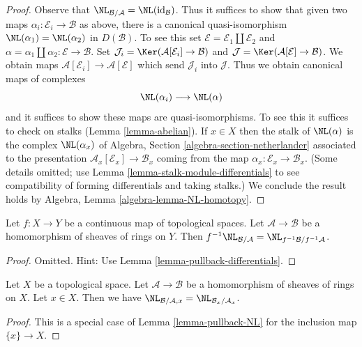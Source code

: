 \begin{proof}
Observe that $\NL_{\mathcal{B}/\mathcal{A}} = \NL(\text{id}_\mathcal{B})$.
Thus it suffices to show that given two maps
$\alpha_i : \mathcal{E}_i \to \mathcal{B}$ as above, there is a
canonical quasi-isomorphism $\NL(\alpha_1) = \NL(\alpha_2)$ in $D(\mathcal{B})$.
To see this set $\mathcal{E} = \mathcal{E}_1 \amalg \mathcal{E}_2$ and
$\alpha = \alpha_1 \amalg \alpha_2 : \mathcal{E} \to \mathcal{B}$.
Set
$\mathcal{J}_i = \Ker(\mathcal{A}[\mathcal{E}_i] \to \mathcal{B})$
and
$\mathcal{J} = \Ker(\mathcal{A}[\mathcal{E}] \to \mathcal{B})$.
We obtain maps $\mathcal{A}[\mathcal{E}_i] \to \mathcal{A}[\mathcal{E}]$
which send $\mathcal{J}_i$ into $\mathcal{J}$.
Thus we obtain canonical maps of complexes
$$
\NL(\alpha_i) \longrightarrow \NL(\alpha)
$$
and it suffices to show these maps are quasi-isomorphisms. To see this
it suffices to check on stalks (Lemma \ref{lemma-abelian}). If $x \in X$
then the stalk of $\NL(\alpha)$ is the complex $\NL(\alpha_x)$ of
Algebra, Section \ref{algebra-section-netherlander}
associated to the presentation $\mathcal{A}_x[\mathcal{E}_x] \to \mathcal{B}_x$
coming from the map $\alpha_x : \mathcal{E}_x \to \mathcal{B}_x$.
(Some details omitted; use Lemma \ref{lemma-stalk-module-differentials}
to see compatibility of forming differentials and taking stalks.)
We conclude the result holds by
Algebra, Lemma \ref{algebra-lemma-NL-homotopy}.
\end{proof}

\begin{lemma}
\label{lemma-pullback-NL}
Let $f : X \to Y$ be a continuous map of topological spaces.
Let $\mathcal{A} \to \mathcal{B}$ be a homomorphism of sheaves of rings
on $Y$. Then $f^{-1}\NL_{\mathcal{B}/\mathcal{A}} =
\NL_{f^{-1}\mathcal{B}/f^{-1}\mathcal{A}}$.
\end{lemma}

\begin{proof}
Omitted. Hint: Use Lemma \ref{lemma-pullback-differentials}.
\end{proof}

\begin{lemma}
\label{lemma-stalk-NL}
Let $X$ be a topological space. Let $\mathcal{A} \to \mathcal{B}$
be a homomorphism of sheaves of rings on $X$. Let $x \in X$.
Then we have $\NL_{\mathcal{B}/\mathcal{A}, x} =
\NL_{\mathcal{B}_x/\mathcal{A}_x}$.
\end{lemma}

\begin{proof}
This is a special case of Lemma \ref{lemma-pullback-NL}
for the inclusion map $\{x\} \to X$.
\end{proof}

